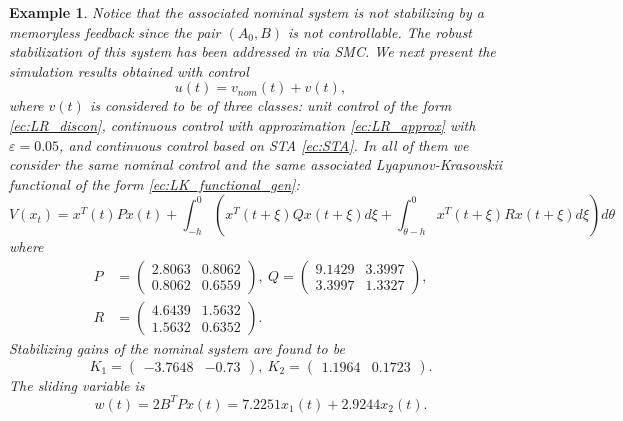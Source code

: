 \documentclass[onecolumn]{IEEEtran}
\newtheorem{example}{Example}
\begin{document}
\begin{example}
	
	Notice that the associated nominal system is not  stabilizing by a memoryless feedback since the pair $(A_0,B)$ is not controllable. The robust stabilization of this system has been addressed in \cite{Gouaisbautetal2002}  via SMC. We next  present the simulation results obtained  with control
	\begin{equation*}
	u(t)=v_{nom}(t)+v(t),
	\end{equation*}
	where $v(t)$ is considered to be of three classes: unit control of the form \eqref{ec:LR_discon}, continuous control with  approximation \eqref{ec:LR_approx} with $\varepsilon=0.05$, and continuous control based on STA \eqref{ec:STA}.  In all of them we consider the same nominal control and the same associated Lyapunov-Krasovskii functional of the  form \eqref{ec:LK_functional_gen}:
	\begin{equation*}
	V(x_t)=x^T(t)Px(t)+\int_{-h}^{0}\left(x^T(t+\xi)Qx(t+\xi)d\xi+\int_{\theta-h}^{0}x^T(t+\xi)Rx(t+\xi)d\xi\right)d\theta
	\end{equation*}
	where
	\begin{align*}
	P&=\begin{pmatrix}
	 2.8063  &   0.8062\\
	0.8062   & 0.6559
	\end{pmatrix}, \: Q=\begin{pmatrix}
	9.1429 &   3.3997\\
	3.3997  &  1.3327
	\end{pmatrix},\\R&=\begin{pmatrix}
	4.6439 &   1.5632\\
	1.5632  &  0.6352
	\end{pmatrix}.
	\end{align*}
	Stabilizing gains of the nominal system are found to be
	\begin{equation*}
	K_1=\begin{pmatrix}
	-3.7648 & -0.73
	\end{pmatrix},\:K_2=\begin{pmatrix}
	1.1964 & 0.1723
	\end{pmatrix}.
	\end{equation*}
	The sliding variable is 
	\begin{equation*}
	w(t)=2B^TPx(t)=7.2251x_1(t)+2.9244x_2(t).
	\end{equation*}
	

\end{example}
\end{document}
